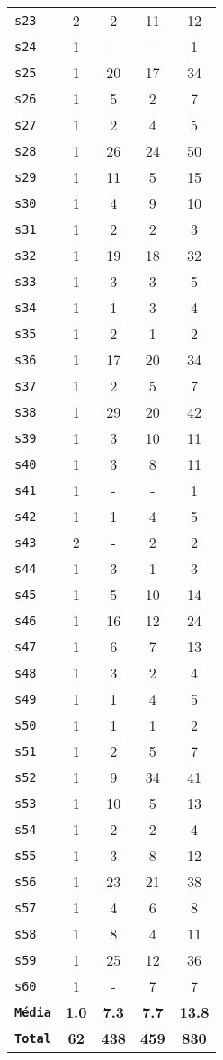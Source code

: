 \begin{longtable}{ l c c c c }
\texttt{s23} & 2 & 2 & 11 & 12 \\
\texttt{s24} & 1 & - & - & 1 \\
\texttt{s25} & 1 & 20 & 17 & 34 \\
\texttt{s26} & 1 & 5 & 2 & 7 \\
\texttt{s27} & 1 & 2 & 4 & 5 \\
\texttt{s28} & 1 & 26 & 24 & 50 \\
\texttt{s29} & 1 & 11 & 5 & 15 \\
\texttt{s30} & 1 & 4 & 9 & 10 \\
\texttt{s31} & 1 & 2 & 2 & 3 \\
\texttt{s32} & 1 & 19 & 18 & 32 \\
\texttt{s33} & 1 & 3 & 3 & 5 \\
\texttt{s34} & 1 & 1 & 3 & 4 \\
\texttt{s35} & 1 & 2 & 1 & 2 \\
\texttt{s36} & 1 & 17 & 20 & 34 \\
\texttt{s37} & 1 & 2 & 5 & 7 \\
\texttt{s38} & 1 & 29 & 20 & 42 \\
\texttt{s39} & 1 & 3 & 10 & 11 \\
\texttt{s40} & 1 & 3 & 8 & 11 \\
\texttt{s41} & 1 & - & - & 1 \\
\texttt{s42} & 1 & 1 & 4 & 5 \\
\texttt{s43} & 2 & - & 2 & 2 \\
\texttt{s44} & 1 & 3 & 1 & 3 \\
\texttt{s45} & 1 & 5 & 10 & 14 \\
\texttt{s46} & 1 & 16 & 12 & 24 \\
\texttt{s47} & 1 & 6 & 7 & 13 \\
\texttt{s48} & 1 & 3 & 2 & 4 \\
\texttt{s49} & 1 & 1 & 4 & 5 \\
\texttt{s50} & 1 & 1 & 1 & 2 \\
\texttt{s51} & 1 & 2 & 5 & 7 \\
\texttt{s52} & 1 & 9 & 34 & 41 \\
\texttt{s53} & 1 & 10 & 5 & 13 \\
\texttt{s54} & 1 & 2 & 2 & 4 \\
\texttt{s55} & 1 & 3 & 8 & 12 \\
\texttt{s56} & 1 & 23 & 21 & 38 \\
\texttt{s57} & 1 & 4 & 6 & 8 \\
\texttt{s58} & 1 & 8 & 4 & 11 \\
\texttt{s59} & 1 & 25 & 12 & 36 \\
\texttt{s60} & 1 & - & 7 & 7 \\
\texttt{{\bf Média}} & {\bf 1.0} & {\bf 7.3} & {\bf 7.7} & {\bf 13.8} \\
\texttt{{\bf Total}} & {\bf 62} & {\bf 438} & {\bf 459} & {\bf 830} \\
\end{longtable}
